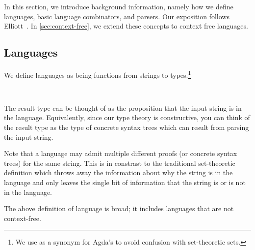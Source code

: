 In this section, we introduce background information, namely how we define languages, basic language combinators, and parsers. Our exposition follows Elliott~\cite{conal-languages}. In \cref{sec:context-free}, we extend these concepts to context free languages.

\subsection{Languages}

We define languages as being functions from strings to types.\footnote{We use  as a synonym for Agda's  to avoid confusion with set-theoretic sets.}%
\begin{code}[hide]%
\>[0]\<%
\\
\>[0][@{}l@{\AgdaIndent{0}}]%
\>[4]\AgdaSpace{}%
\AgdaSymbol{:}\AgdaSpace{}%
\<%
\end{code}
\begin{code}%
%
\>[4]\AgdaSpace{}%
\AgdaSymbol{=}\AgdaSpace{}%
\AgdaSpace{}%
\AgdaSpace{}%
\<%
\end{code}
The result type can be thought of as the proposition that the input string is in the language.
Equivalently, since our type theory is constructive, you can think of the result type as the type of concrete syntax trees which can result from parsing the input string.
\begin{remark}
Note that a language may admit multiple different proofs (or concrete syntax trees) for the same string. This is in constrast to the traditional set-theoretic definition which throws away the information about why the string
is in the language and only leaves the single bit of information that the string is or is not in the language.
\end{remark}
The above definition of language is broad; it includes languages that are not context-free.
